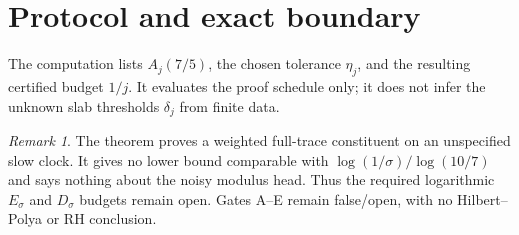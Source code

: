 \documentclass[11pt]{article}
\theoremstyle{remark}\newtheorem{remark}[theorem]{Remark}
\begin{document}
\section{Protocol and exact boundary}
The computation lists $A_j(7/5)$, the chosen tolerance $\eta_j$, and the
resulting certified budget $1/j$.  It evaluates the proof schedule only; it
does not infer the unknown slab thresholds $\delta_j$ from finite data.

\begin{remark}
The theorem proves a weighted full-trace constituent on an unspecified slow
clock.  It gives no lower bound comparable with
$\log(1/\sigma)/\log(10/7)$ and says nothing about the noisy modulus head.
Thus the required logarithmic $E_\sigma$ and $D_\sigma$ budgets remain open.
Gates A--E remain false/open, with no Hilbert--Polya or RH conclusion.
\end{remark}
\end{document}
